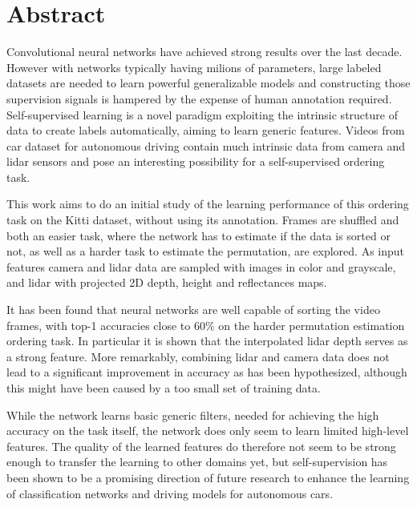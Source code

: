 %

\newpage
\vspace{3cm}

\chapter*{Abstract}
Convolutional neural networks have achieved strong results over the last decade. However with networks typically having milions of parameters, large labeled datasets are needed to learn powerful generalizable models and constructing those supervision signals is hampered by the expense of human annotation required. Self-supervised learning is a novel paradigm exploiting the intrinsic structure of data to create labels automatically, aiming to learn generic features. Videos from car dataset for autonomous driving contain much intrinsic data from camera and lidar sensors and pose an interesting possibility for a self-supervised ordering task. 

This work aims to do an initial study of the learning performance of this ordering task on the Kitti dataset, without using its annotation. Frames are shuffled and both an easier task, where the network has to estimate if the data is sorted or not, as well as a harder task to estimate the permutation, are explored. As input features camera and lidar data are sampled with images in color and grayscale, and lidar with projected 2D depth, height and reflectances maps.

It has been found that neural networks are well capable of sorting the video frames, with top-1 accuracies close to 60\% on the harder permutation estimation ordering task. In particular it is shown that the interpolated lidar depth serves as a strong feature. More remarkably, combining lidar and camera data does not lead to a significant improvement in accuracy as has been hypothesized, although this might have been caused by a too small set of training data.

While the network learns basic generic filters, needed for achieving the high accuracy on the task itself, the network does only seem to learn limited high-level features. The quality of the learned features do therefore not seem to be strong enough to transfer the learning to other domains yet, but self-supervision has been shown to be a promising direction of future research to enhance the learning of classification networks and driving models for autonomous cars.

